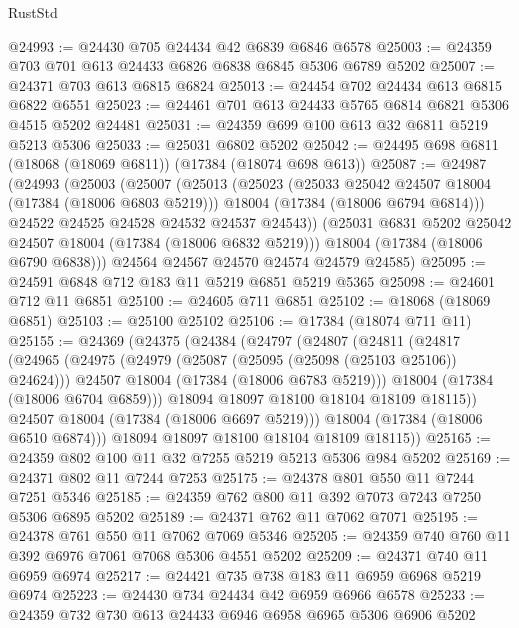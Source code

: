 \begin{lexlean}{RustStd}
\begin{coremodule}
@24993 := @24430 @705 @24434 @42 @6839 @6846 @6578
@25003 := @24359 @703 @701 @613 @24433 @6826 @6838 @6845 @5306 @6789 @5202
@25007 := @24371 @703 @613 @6815 @6824
@25013 := @24454 @702 @24434 @613 @6815 @6822 @6551
@25023 := @24461 @701 @613 @24433 @5765 @6814 @6821 @5306 @4515 @5202 @24481
@25031 := @24359 @699 @100 @613 @32 @6811 @5219 @5213 @5306
@25033 := @25031 @6802 @5202
@25042 := @24495 @698 @6811 (@18068 (@18069 @6811)) (@17384 (@18074 @698 @613))
@25087 := @24987
    (@24993
      (@25003
        (@25007
          (@25013
            (@25023
              (@25033 @25042 @24507 @18004 (@17384 (@18006 @6803 @5219)))
              @18004
              (@17384 (@18006 @6794 @6814)))
            @24522
            @24525
            @24528
            @24532
            @24537
            @24543))
        (@25031 @6831 @5202 @25042 @24507 @18004 (@17384 (@18006 @6832 @5219)))
        @18004
        (@17384 (@18006 @6790 @6838)))
      @24564
      @24567
      @24570
      @24574
      @24579
      @24585)
@25095 := @24591 @6848 @712 @183 @11 @5219 @6851 @5219 @5365
@25098 := @24601 @712 @11 @6851
@25100 := @24605 @711 @6851
@25102 := @18068 (@18069 @6851)
@25103 := @25100 @25102
@25106 := @17384 (@18074 @711 @11)
@25155 := @24369
    (@24375
      (@24384
        (@24797
          (@24807
            (@24811
              (@24817
                (@24965
                  (@24975
                    (@24979 (@25087 (@25095 (@25098 (@25103 @25106)) @24624)))
                    @24507
                    @18004
                    (@17384 (@18006 @6783 @5219)))
                  @18004
                  (@17384 (@18006 @6704 @6859)))
                @18094
                @18097
                @18100
                @18104
                @18109
                @18115))
            @24507
            @18004
            (@17384 (@18006 @6697 @5219)))
          @18004
          (@17384 (@18006 @6510 @6874)))
        @18094
        @18097
        @18100
        @18104
        @18109
        @18115))
@25165 := @24359 @802 @100 @11 @32 @7255 @5219 @5213 @5306 @984 @5202
@25169 := @24371 @802 @11 @7244 @7253
@25175 := @24378 @801 @550 @11 @7244 @7251 @5346
@25185 := @24359 @762 @800 @11 @392 @7073 @7243 @7250 @5306 @6895 @5202
@25189 := @24371 @762 @11 @7062 @7071
@25195 := @24378 @761 @550 @11 @7062 @7069 @5346
@25205 := @24359 @740 @760 @11 @392 @6976 @7061 @7068 @5306 @4551 @5202
@25209 := @24371 @740 @11 @6959 @6974
@25217 := @24421 @735 @738 @183 @11 @6959 @6968 @5219 @6974
@25223 := @24430 @734 @24434 @42 @6959 @6966 @6578
@25233 := @24359 @732 @730 @613 @24433 @6946 @6958 @6965 @5306 @6906 @5202

\end{coremodule}
\end{lexlean}
